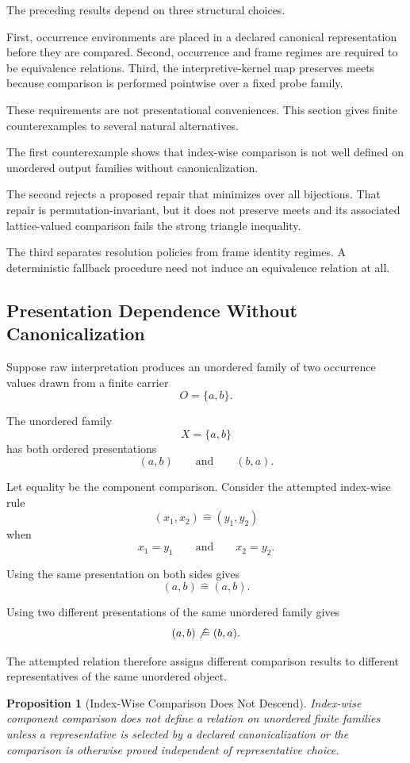 \documentclass[11pt]{article}
\theoremstyle{plain}
\newtheorem{proposition}[theorem]{Proposition}
\theoremstyle{definition}
\theoremstyle{remark}
\begin{document}
The preceding results depend on three structural choices.

First,
occurrence environments are placed in a declared canonical representation
before they are compared.
Second,
occurrence and frame regimes are required to be equivalence relations.
Third,
the interpretive-kernel map preserves meets
because comparison is performed pointwise
over a fixed probe family.

These requirements are not presentational conveniences.
This section gives finite counterexamples
to several natural alternatives.

The first counterexample shows that index-wise comparison is not well defined
on unordered output families without canonicalization.

The second rejects a proposed repair
that minimizes over all bijections.
That repair is permutation-invariant,
but it does not preserve meets
and its associated lattice-valued comparison
fails the strong triangle inequality.

The third separates resolution policies
from frame identity regimes.
A deterministic fallback procedure
need not induce an equivalence relation at all.

\subsection{Presentation Dependence Without Canonicalization}

Suppose raw interpretation produces
an unordered family of two occurrence values
drawn from a finite carrier
\[
  O
  =
  \{a,b\}.
\]

The unordered family
\[
  X
  =
  \{a,b\}
\]
has both ordered presentations
\[
  (a,b)
  \qquad\text{and}\qquad
  (b,a).
\]

Let equality be the component comparison.
Consider the attempted index-wise rule
\[
  (x_1,x_2)
  \mathrel{\widehat{=}}
  (y_1,y_2)
\]
when
\[
  x_1=y_1
  \qquad\text{and}\qquad
  x_2=y_2.
\]

Using the same presentation on both sides gives
\[
  (a,b)
  \mathrel{\widehat{=}}
  (a,b).
\]

Using two different presentations
of the same unordered family gives
\[
  (a,b)
  \mathrel{\not\widehat{=}}
  (b,a).
\]

The attempted relation therefore assigns
different comparison results
to different representatives
of the same unordered object.

\begin{proposition}[Index-Wise Comparison Does Not Descend]
  \label{ik.prop.no-canonicalization}
  Index-wise component comparison
  does not define a relation
  on unordered finite families
  unless a representative is selected
  by a declared canonicalization
  or the comparison is otherwise proved
  independent of representative choice.
\end{proposition}
\end{document}
